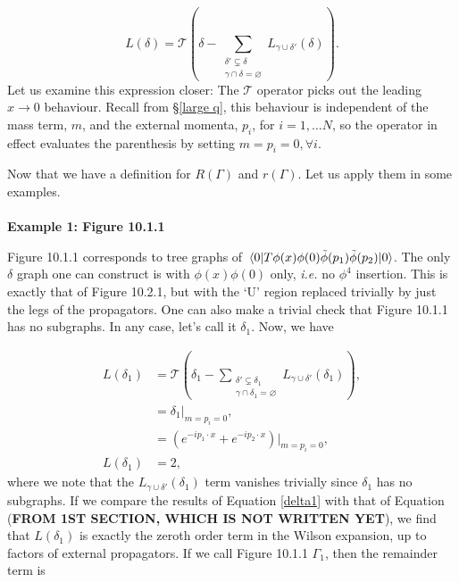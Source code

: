 \documentclass{article}
\begin{document}
\begin{equation}
    L(\delta) = \mathcal{T} \left( \delta - \sum_{\substack{\delta'\varsubsetneq \delta \\ \gamma\cap\delta = \varnothing }} L_{\gamma\cup\delta'}(\delta) \right).
\end{equation}
Let us examine this expression closer:  The $\mathcal{T}$ operator picks out the leading $x\rightarrow 0$ behaviour. Recall from \S\ref{large q}, this behaviour is independent of the mass term, $m$, and the external momenta, $p_i$, for $i=1,\dots N$, so the operator in effect evaluates the parenthesis by setting $m=p_i=0, \forall i$.

Now that we have a definition for $R(\Gamma)$ and $r(\Gamma)$. Let us apply them in some examples.\\ \\

\noindent\textbf{Example 1: Figure 10.1.1}

Figure 10.1.1 corresponds to tree graphs of $\mel{0}{T\phi(x)\phi(0)\Tilde{\phi}(p_1)\Tilde{\phi}(p_2)}{0}$. The only $\delta$ graph one can construct is with $\phi(x)\phi(0)$ only, \textit{i.e.} no $\phi^4$ insertion. This is exactly that of Figure 10.2.1, but with the `U' region replaced trivially by just the legs of the propagators. One can also make a trivial check that Figure 10.1.1 has no subgraphs. In any case, let's call it $\delta_1$. Now, we have

\begin{equation}
\begin{split}
    L(\delta_1) &= \mathcal{T}\left( \delta_1 - \sum_{\substack{\delta'\varsubsetneq \delta_1 \\ \gamma\cap\delta_1 = \varnothing }} L_{\gamma\cup\delta'}(\delta_1)  \right),\\
    &= \delta_1\vert_{m=p_i=0},\\
    &= (e^{-ip_1\cdot x} + e^{-ip_2\cdot x})\vert_{m=p_i=0},\\
    L(\delta_1) &=2,
\end{split}
\label{delta1}
\end{equation}
where we note that the $L_{\gamma\cup\delta'}(\delta_1)$ term vanishes trivially since $\delta_1$ has no subgraphs.  If we compare the results of Equation \ref{delta1} with that of Equation (\textbf{FROM 1ST SECTION, WHICH IS NOT WRITTEN YET}), we find that $L(\delta_1)$ is exactly the zeroth order term in the Wilson expansion, up to factors of external propagators. If we call Figure 10.1.1 $\Gamma_1$, then the remainder term is 
\end{document}
